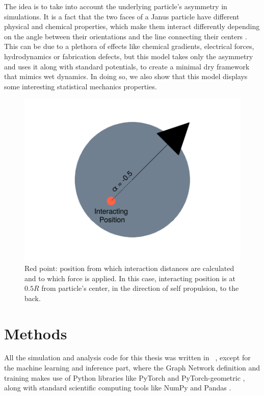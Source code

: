 \documentclass[../../master_thesis_np.tex]{subfiles}
\begin{document}
	The idea is to take into account the underlying particle's asymmetry in simulations. It is a fact that the two faces of a Janus particle have different physical and chemical properties, which make them interact differently depending on the angle between their orientations and the line connecting their centers \cite{singh_pair_2024}. This can be due to a plethora of effects like chemical gradients, electrical forces, hydrodynamics or fabrication defects, but this model takes only the asymmetry and uses it along with standard potentials, to create a minimal dry framework that mimics wet dynamics. In doing so, we also show that this model displays some interesting statistical mechanics properties.
	
	\begin{figure}[htp]
		\centering
		\includegraphics[width=\textwidth]{singpart_draw.png}
		\caption{Red point: position from which interaction distances are calculated and to which force is applied. In this case, interacting position is at $0.5R$ from particle's center, in the direction of self propulsion, to the back.}
		\label{fig:geom_model}
	\end{figure}
	
	\section{Methods}
	All the simulation and analysis code for this thesis was written in \julia\ \cite{julia}, except for the machine learning and inference part, where the Graph Network definition and training makes use of Python libraries like PyTorch \citeauthor{pytorch} and PyTorch-geometric \citeauthor{pyg}, along with standard scientific computing tools like NumPy \citeauthor{numpy} and Pandas \citeauthor{pandas}.
	
\end{document}
